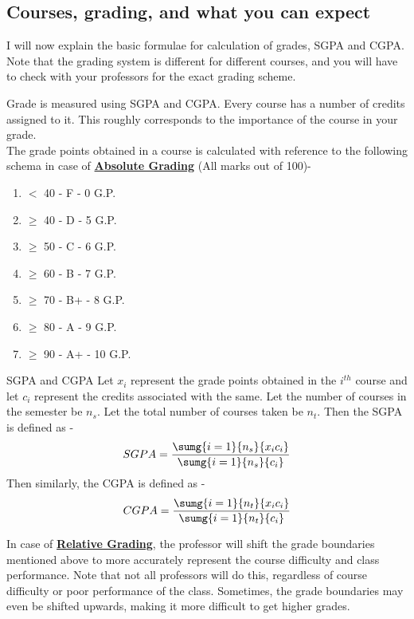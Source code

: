 \documentclass[openany]{book}
\begin{document}
\subsection{Courses, grading, and what you can expect}
I will now explain the basic formulae for calculation of grades, SGPA and CGPA. Note that the grading system is different for different courses, and you will have to check with your professors for the exact grading scheme. \\
\begin{mynote}
    Grade is measured using SGPA and CGPA. Every course has a number of credits assigned to it. This roughly corresponds to the importance of the course in your grade. \\
    The grade points obtained in a course is calculated with reference to the following schema in case of \textbf{\underline{Absolute Grading}} (All marks out of 100)- 
    \begin{enumerate}
        \item $<$ 40 - F - 0 G.P.
        \item $\geq$ 40 - D - 5 G.P.
        \item $\geq$ 50 - C - 6 G.P.
        \item $\geq$ 60 - B - 7 G.P.
        \item $\geq$ 70 - B+ - 8 G.P. 
        \item $\geq$ 80 - A - 9 G.P.
        \item $\geq$ 90 - A+ - 10 G.P. 
    \end{enumerate}
    \begin{mydefinition}{SGPA and CGPA}
    Let $x_i$ represent the grade points obtained in the $i^{th}$ course and let $c_i$ represent the credits associated with the same. Let the number of courses in the semester be $n_s$. Let the total number of courses taken be $n_t$. Then the SGPA is defined as - 
    $$SGPA = \frac{\sumg{i=1}{n_s}{x_{i}c_{i}}}{\sumg{i=1}{n_s}{c_{i}}}$$
    Then similarly, the CGPA is defined as - 
    $$CGPA = \frac{\sumg{i=1}{n_t}{x_{i}c_{i}}}{\sumg{i=1}{n_t}{c_{i}}}$$
    \end{mydefinition}
    In case of \underline{\textbf{Relative Grading}}, the professor will shift the grade boundaries mentioned above to more accurately represent the course difficulty and class performance. Note that not all professors will do this, regardless of course difficulty or poor performance of the class. Sometimes, the grade boundaries may even be shifted upwards, making it more difficult to get higher grades. 
\end{mynote}
\end{document}
